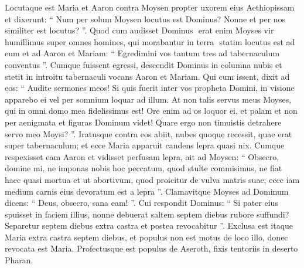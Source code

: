 \begin{biblechapter}
\begin{biblechapter}
\begin{biblechapter}
\begin{biblechapter}
\begin{biblechapter}
\begin{biblechapter}
\begin{biblechapter}
\begin{biblechapter}
\begin{biblechapter}
\begin{biblechapter}
\begin{biblechapter}
\begin{biblechapter}
\verse Locutaque est Maria et Aaron contra Moysen propter uxorem eius Aethiopissam 
\verse et dixerunt: “ Num per solum Moysen locutus est Dominus? Nonne et per nos similiter est locutus? ”. Quod cum audisset Dominus 
\verse ­ erat enim Moyses vir humillimus super omnes homines, qui morabantur in terra ­ 
 \verse statim locutus est ad eum et ad Aaron et Mariam: “ Egredimini vos tantum tres ad tabernaculum conventus ”. Cumque fuissent egressi, 
\verse descendit Dominus in columna nubis et stetit in introitu tabernaculi vocans Aaron et Mariam. Qui cum issent, 
\verse dixit ad eos:
 “ Audite sermones meos!
 Si quis fuerit inter vos propheta Domini,
 in visione apparebo ei
 vel per somnium loquar ad illum.
 \verse At non talis servus meus Moyses,
 qui in omni domo mea fidelissimus est!
 \verse Ore enim ad os loquor ei,
 et palam et non per aenigmata et figuras
 Dominum videt!
 Quare ergo non timuistis detrahere
 servo meo Moysi? ”.
 \verse Iratusque contra eos abiit, 
\verse nubes quoque recessit, quae erat super tabernaculum; et ecce Maria apparuit candens lepra quasi nix.
 Cumque respexisset eam Aaron et vidisset perfusam lepra, 
\verse ait ad Moysen: “ Obsecro, domine mi, ne imponas nobis hoc peccatum, quod stulte commisimus, 
 \verse ne fiat haec quasi mortua et ut abortivum, quod proicitur de vulva matris suae; ecce iam medium carnis eius devoratum est a lepra ”. 
\verse Clamavitque Moyses ad Dominum dicens: “ Deus, obsecro, sana eam! ”. 
\verse Cui respondit Dominus: “ Si pater eius spuisset in faciem illius, nonne debuerat saltem septem diebus rubore suffundi? Separetur septem diebus extra castra et postea revocabitur ”. 
\verse Exclusa est itaque Maria extra castra septem diebus, et populus non est motus de loco illo, donec revocata est Maria.
 \verse Profectusque est populus de Aseroth, fixis tentoriis in deserto Pharan.
 

\end{biblechapter}
\end{biblechapter}
\end{biblechapter}
\end{biblechapter}
\end{biblechapter}
\end{biblechapter}
\end{biblechapter}
\end{biblechapter}
\end{biblechapter}
\end{biblechapter}
\end{biblechapter}
\end{biblechapter}
